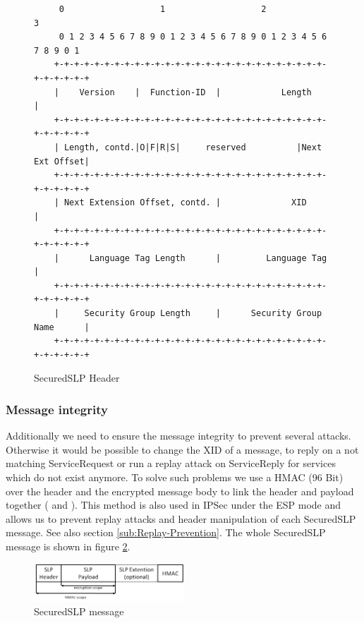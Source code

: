 \begin{figure}[!h]
\begin{lstlisting}
	 0                   1                   2                   3
	 0 1 2 3 4 5 6 7 8 9 0 1 2 3 4 5 6 7 8 9 0 1 2 3 4 5 6 7 8 9 0 1
	+-+-+-+-+-+-+-+-+-+-+-+-+-+-+-+-+-+-+-+-+-+-+-+-+-+-+-+-+-+-+-+-+
	|    Version    |  Function-ID  |            Length             |
	+-+-+-+-+-+-+-+-+-+-+-+-+-+-+-+-+-+-+-+-+-+-+-+-+-+-+-+-+-+-+-+-+
	| Length, contd.|O|F|R|S|     reserved          |Next Ext Offset|
	+-+-+-+-+-+-+-+-+-+-+-+-+-+-+-+-+-+-+-+-+-+-+-+-+-+-+-+-+-+-+-+-+
	| Next Extension Offset, contd. |              XID              |
	+-+-+-+-+-+-+-+-+-+-+-+-+-+-+-+-+-+-+-+-+-+-+-+-+-+-+-+-+-+-+-+-+
	|      Language Tag Length      |         Language Tag          |
	+-+-+-+-+-+-+-+-+-+-+-+-+-+-+-+-+-+-+-+-+-+-+-+-+-+-+-+-+-+-+-+-+
	|     Security Group Length     |      Security Group Name      |
	+-+-+-+-+-+-+-+-+-+-+-+-+-+-+-+-+-+-+-+-+-+-+-+-+-+-+-+-+-+-+-+-+
\end{lstlisting}
\caption{SecuredSLP Header}
\label{fig:sslp-header}
\end{figure}

\subsubsection{Message integrity}
Additionally we need to ensure the message integrity to prevent several attacks. Otherwise it would be possible to change the XID of a message, to reply on a not matching ServiceRequest or run a replay attack on ServiceReply for services which do not exist anymore. To solve such problems we use a HMAC (96 Bit) over the header and the encrypted message body to link the header and payload together (\citep{Kraw97} and \citep{Kero00}). This method is also used in IPSec under the ESP mode and allows us to prevent replay attacks and header manipulation of each SecuredSLP message. See also section \ref{sub:Replay-Prevention}. The whole SecuredSLP message is shown in figure \ref{fig:sslp-message}.
\begin{figure}[!h]
\centering\includegraphics[width=0.5\textwidth]{Images/HMAC}
\caption{SecuredSLP message}
\label{fig:sslp-message}
\end{figure}

